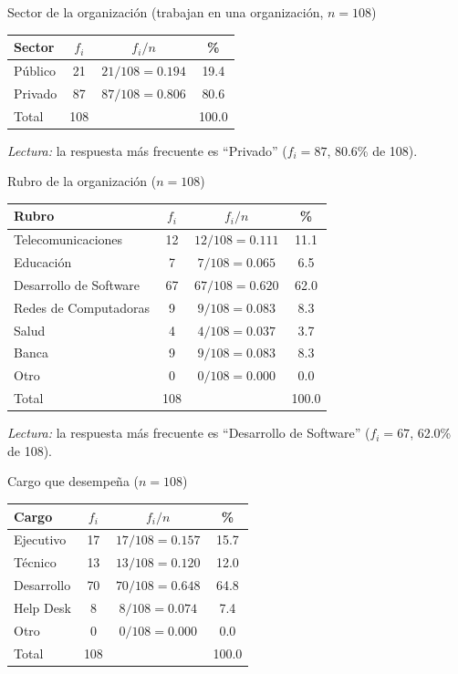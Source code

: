 \begin{mitabla}{Sector de la organización (trabajan en una organización, $n=108$)}
\begin{tabular}{lccc}
\toprule
Sector & $f_i$ & $f_i / n$ & \% \\
\midrule
Público & 21 & $21/108 = 0.194$ & 19.4 \\
Privado & 87 & $87/108 = 0.806$ & 80.6 \\
\midrule
Total & 108 & & 100.0 \\
\bottomrule
\end{tabular}
\end{mitabla}

\textit{Lectura:} la respuesta más frecuente es ``Privado'' ($f_i = 87$, 80.6\% de 108).

\begin{mitabla}{Rubro de la organización ($n=108$)}
\begin{tabular}{lccc}
\toprule
Rubro & $f_i$ & $f_i / n$ & \% \\
\midrule
Telecomunicaciones & 12 & $12/108 = 0.111$ & 11.1 \\
Educación & 7 & $7/108 = 0.065$ & 6.5 \\
Desarrollo de Software & 67 & $67/108 = 0.620$ & 62.0 \\
Redes de Computadoras & 9 & $9/108 = 0.083$ & 8.3 \\
Salud & 4 & $4/108 = 0.037$ & 3.7 \\
Banca & 9 & $9/108 = 0.083$ & 8.3 \\
Otro & 0 & $0/108 = 0.000$ & 0.0 \\
\midrule
Total & 108 & & 100.0 \\
\bottomrule
\end{tabular}
\end{mitabla}

\textit{Lectura:} la respuesta más frecuente es ``Desarrollo de Software'' ($f_i = 67$, 62.0\% de 108).

\begin{mitabla}{Cargo que desempeña ($n=108$)}
\begin{tabular}{lccc}
\toprule
Cargo & $f_i$ & $f_i / n$ & \% \\
\midrule
Ejecutivo & 17 & $17/108 = 0.157$ & 15.7 \\
Técnico & 13 & $13/108 = 0.120$ & 12.0 \\
Desarrollo & 70 & $70/108 = 0.648$ & 64.8 \\
Help Desk & 8 & $8/108 = 0.074$ & 7.4 \\
Otro & 0 & $0/108 = 0.000$ & 0.0 \\
\midrule
Total & 108 & & 100.0 \\
\bottomrule
\end{tabular}
\end{mitabla}

